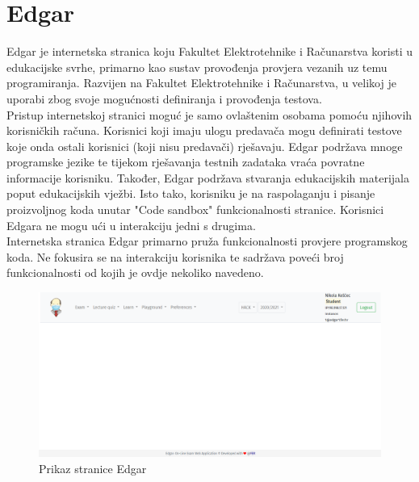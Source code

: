 \documentclass[times, utf8, zavrsni]{fer}
\begin{document}
		\section{Edgar}
		Edgar je internetska stranica koju Fakultet Elektrotehnike i Računarstva koristi u edukacijske svrhe, primarno kao sustav provođenja provjera vezanih uz temu programiranja. Razvijen na Fakultet Elektrotehnike i Računarstva, u velikoj je uporabi zbog svoje mogućnosti definiranja i provođenja testova. \\
		Pristup internetskoj stranici moguć je samo ovlaštenim osobama pomoću njihovih korisničkih računa. Korisnici koji imaju ulogu predavača mogu definirati testove koje onda ostali korisnici (koji nisu predavači) rješavaju. Edgar podržava mnoge programske jezike te tijekom rješavanja testnih zadataka vraća povratne informacije korisniku. Također, Edgar podržava stvaranja edukacijskih materijala poput edukacijskih vježbi. Isto tako, korisniku je na raspolaganju i pisanje proizvoljnog koda unutar "Code sandbox" funkcionalnosti stranice. Korisnici Edgara ne mogu ući u interakciju jedni s drugima.\\
		Internetska stranica Edgar primarno pruža funkcionalnosti provjere programskog koda. Ne fokusira se na interakciju korisnika te sadržava poveći broj funkcionalnosti od kojih je ovdje nekoliko navedeno.
		\begin{figure}[H]
			\centering
			\includegraphics[width=\linewidth]{pictures/prikazi/Edgar.png}
			\caption{Prikaz stranice Edgar}
			\label{fig:edgar}
		\end{figure}
	
\end{document}
